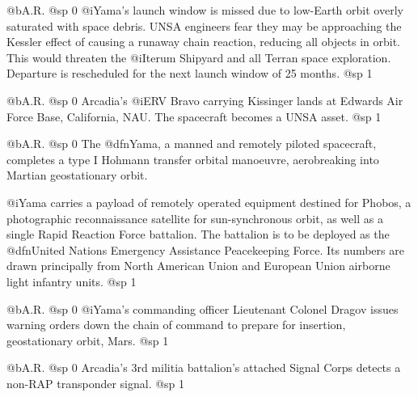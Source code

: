 @b{A.R.}
@sp 0
@i{Yama's} launch window is missed due to low-Earth orbit overly saturated with space debris. UNSA engineers fear they may be approaching the Kessler effect of causing a runaway chain reaction, reducing all objects in orbit. This would threaten the @i{Iterum Shipyard} and all Terran space exploration. Departure is rescheduled for the next launch window of 25 months.
@sp 1

@b{A.R.}
@sp 0
Arcadia's @i{ERV Bravo} carrying Kissinger lands at Edwards Air Force Base, California, NAU. The spacecraft becomes a UNSA asset.
@sp 1

@b{A.R.}
@sp 0
The @dfn{Yama}, a manned and remotely piloted spacecraft, completes a type I Hohmann transfer orbital manoeuvre, aerobreaking into Martian geostationary orbit. 

@i{Yama} carries a payload of remotely operated equipment destined for Phobos, a photographic reconnaissance satellite for sun-synchronous orbit, as well as a single Rapid Reaction Force battalion. The battalion is to be deployed as the @dfn{United Nations Emergency Assistance Peacekeeping Force}. Its numbers are drawn principally from North American Union and European Union airborne light infantry units.
@sp 1

@b{A.R.}
@sp 0
@i{Yama's} commanding officer Lieutenant Colonel Dragov issues warning orders down the chain of command to prepare for insertion, geostationary orbit, Mars.
@sp 1

@b{A.R.}
@sp 0
Arcadia's 3rd militia battalion's attached Signal Corps detects a non-RAP transponder signal.
@sp 1

